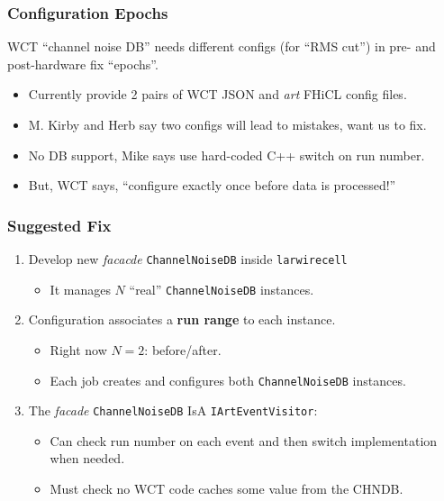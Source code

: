 \documentclass[xcolor=dvipsnames]{beamer}
\begin{document}
\begin{frame}
  \frametitle{Configuration Epochs}
  WCT ``channel noise DB'' needs different configs (for ``RMS cut'')
  in pre- and post-hardware fix ``epochs''.
  \begin{itemize}\footnotesize
  \item Currently provide 2 pairs of WCT JSON and \textit{art} FHiCL config files.
  \item M. Kirby and Herb say two configs will lead to mistakes, want
    us to fix.
  \item No DB support, Mike says use hard-coded C++ switch on run number.
  \item But, WCT says, ``configure exactly once before data is processed!''
  \end{itemize}
  
\end{frame}
\begin{frame}
  \frametitle{Suggested Fix}
  \begin{enumerate}\footnotesize
  \item Develop new \textit{facacde} \texttt{ChannelNoiseDB} inside \texttt{larwirecell}
    \begin{itemize}\scriptsize
    \item It manages $N$ ``real'' \texttt{ChannelNoiseDB} instances.
    \end{itemize}
  \item Configuration associates a \textbf{run range} to each instance.
    \begin{itemize}\scriptsize
    \item Right now $N=2$: before/after.
    \item Each job creates and configures both \texttt{ChannelNoiseDB} instances.
    \end{itemize}
  \item The \textit{facade} \texttt{ChannelNoiseDB} IsA
    \texttt{IArtEventVisitor}:
    \begin{itemize}\scriptsize
    \item Can check run number on each event and then switch
      implementation when needed.
    \item Must check no WCT code caches some value from the CHNDB.
    \end{itemize}
  \end{enumerate}
  
\end{frame}
\end{document}
